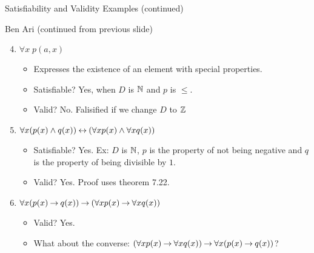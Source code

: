 \documentclass[style=sailor,size=12pt]{powerdot}
\begin{document}
\begin{wideslide}[bm=,toc=]{Satisfiability and Validity Examples (continued)}
\begin{defn}{7.25}{Ben Ari}
(continued from previous slide)
\end{defn}
\begin{enumerate}
\setcounter{enumi}{3}
\item<2-> $\forall x \; p(a,x)$
\begin{itemize}
\item<3-> Expresses the existence of an element with special properties.
\item<3-> Satisfiable? \pause[3] Yes, when $D$ is $\mathbb{N}$ and $p$ is $\leq$.
\item<3-> Valid? \pause No. Falisified if we change $D$ to $\mathbb{Z}$ 
\end{itemize}
\item<6-> $\forall x (p(x) \land q(x)) \mathbin{\leftrightarrow} (\forall x p(x) \land \forall x
    q(x))$
\begin{itemize}
\item<7-> Satisfiable? \pause[3] Yes. Ex: $D$ is $\mathbb{N}$, $p$ is the property of
not being negative and $q$ is the property of being divisible by $1$. 
\item<7-> Valid? \pause Yes. Proof uses theorem 7.22. 
\end{itemize}
\item<10-> $\forall x (p(x) \mathbin{\rightarrow} q(x)) \mathbin{\rightarrow} (\forall x p(x) \mathbin{\rightarrow} \forall x q(x))$
\begin{itemize}
\item<11-> Valid? \pause Yes. 
\item<11-> What about the converse: $(\forall x p(x) \mathbin{\rightarrow} \forall x q(x)) \mathbin{\rightarrow} \forall x (p(x) \mathbin{\rightarrow} q(x))$?
\end{itemize}
\end{enumerate}
\end{wideslide}
\end{document}
